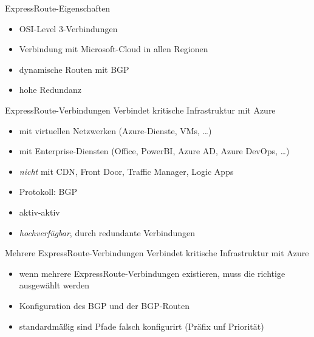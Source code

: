 \begin{flashcard}[]{ExpressRoute-Eigenschaften}
  \begin{itemize}
    \item OSI-Level 3-Verbindungen
    \item Verbindung mit Microsoft-Cloud in allen Regionen
    \item dynamische Routen mit BGP
    \item hohe Redundanz
  \end{itemize}
\end{flashcard}

\begin{flashcard}[]{ExpressRoute-Verbindungen}
  Verbindet kritische Infrastruktur mit Azure
  \begin{itemize}
    \item mit virtuellen Netzwerken (Azure-Dienste, VMs, \ldots)
    \item mit Enterprise-Diensten (Office, PowerBI, Azure AD, Azure DevOps, \ldots)
    \item \emph{nicht} mit CDN, Front Door, Traffic Manager, Logic Apps
    \item Protokoll: BGP
    \item aktiv-aktiv
    \item \emph{hochverfügbar}, durch redundante Verbindungen
  \end{itemize}
\end{flashcard}

\begin{flashcard}[]{Mehrere ExpressRoute-Verbindungen}
  Verbindet kritische Infrastruktur mit Azure
  \begin{itemize}
    \item wenn mehrere ExpressRoute-Verbindungen existieren, muss die richtige ausgewählt werden
    \item Konfiguration des BGP und der BGP-Routen
    \item standardmäßig sind Pfade falsch konfigurirt (Präfix unf Priorität)
  \end{itemize}
\end{flashcard}

